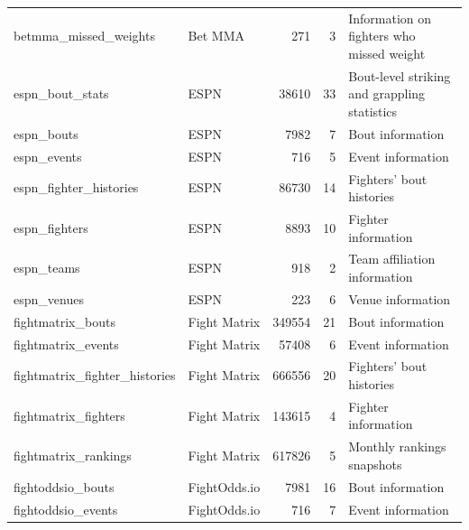 \documentclass[12pt,twoside]{report}
\begin{document}
\begin{longtable}{llrrl}
betmma\_missed\_weights                 & Bet MMA         & 271     & 3          & Information on fighters who missed weight              \\
espn\_bout\_stats                       & ESPN            & 38610   & 33         & Bout-level striking and grappling statistics           \\
espn\_bouts                             & ESPN            & 7982    & 7          & Bout information                                       \\
espn\_events                            & ESPN            & 716     & 5          & Event information                                      \\
espn\_fighter\_histories                & ESPN            & 86730   & 14         & Fighters' bout histories                               \\
espn\_fighters                          & ESPN            & 8893    & 10         & Fighter information                                    \\
espn\_teams                             & ESPN            & 918     & 2          & Team affiliation information                           \\
espn\_venues                            & ESPN            & 223     & 6          & Venue information                                      \\
fightmatrix\_bouts                      & Fight Matrix    & 349554  & 21         & Bout information                                       \\
fightmatrix\_events                     & Fight Matrix    & 57408   & 6          & Event information                                      \\
fightmatrix\_fighter\_histories         & Fight Matrix    & 666556  & 20         & Fighters' bout histories                               \\
fightmatrix\_fighters                   & Fight Matrix    & 143615  & 4          & Fighter information                                    \\
fightmatrix\_rankings                   & Fight Matrix    & 617826  & 5          & Monthly rankings snapshots                             \\
fightoddsio\_bouts                      & FightOdds.io    & 7981    & 16         & Bout information                                       \\
fightoddsio\_events                     & FightOdds.io    & 716     & 7          & Event information                                      \\

\end{longtable}
\end{document}

